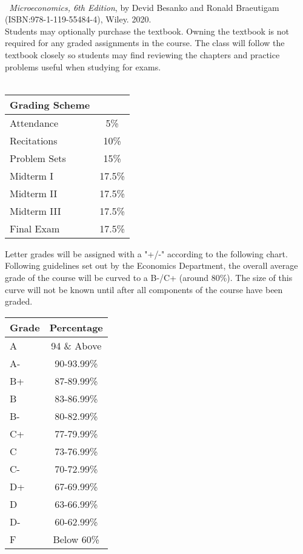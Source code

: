 \documentclass[11pt]{article}
\begin{document}
\\
{\sl \ Microeconomics, 6th Edition}, by Devid Besanko and Ronald Braeutigam (ISBN:978-1-119-55484-4), Wiley. 2020.\\
Students may optionally purchase the textbook.  Owning the textbook is not required for any graded assignments in the course.  The class will follow the textbook closely so students may find reviewing the chapters and practice problems useful when studying for exams.\\
\newpage
{}\\
\begin{center}
\begin{tabular}{lc}
    \hline
    Grading Scheme \\
    \hline
    Attendance & 5\% \\
    Recitations & 10\% \\
    Problem Sets & 15\% \\
    Midterm I & 17.5\% \\
    Midterm II & 17.5\% \\
    Midterm III & 17.5\% \\
    Final Exam & 17.5\% \\
\end{tabular}
\end{center}
Letter grades will be assigned with a "+/-" according to the following chart.  Following guidelines set out by the Economics Department, the overall average grade of the course will be curved to a B-/C+ (around 80\%).  The size of this curve will not be known until after all components of the course have been graded. \\
\begin{center}
\begin{tabular}{|l|c|}
    \hline
    Grade & Percentage \\
    \hline
    A & 94 \& Above \\
    A- & 90-93.99\% \\
    B+ & 87-89.99\% \\
    B & 83-86.99\% \\
    B- & 80-82.99\% \\
    C+ & 77-79.99\% \\
    C & 73-76.99\% \\
    C- & 70-72.99\% \\
    D+ & 67-69.99\% \\
    D & 63-66.99\% \\
    D- & 60-62.99\% \\
    F & Below 60\% \\
    \hline
\end{tabular}
\end{center}
\end{document}
